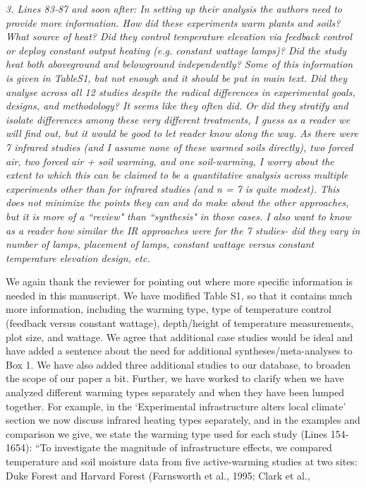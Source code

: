 \documentclass[11pt,a4paper]{letter}
\begin{document}
\begin{letter}{}
\par \emph{3. Lines 83-87 and soon after: In setting up their analysis the authors need to provide more information. How did these experiments warm plants and soils? What source of heat? Did they control temperature elevation via feedback control or deploy constant output heating (e.g. constant wattage lamps)? Did the study heat both aboveground and belowground independently? Some of this information is given in TableS1, but not enough and it should be put in main text. Did they analyse across all 12 studies despite the radical differences in experimental goals, designs, and methodology? It seems like they often did. Or did they stratify and isolate differences among these very different treatments, I guess as a reader we will find out, but it would be good to let reader know along the way. As there were 7 infrared studies (and I assume none of these warmed soils directly), two forced air, two forced air + soil warming, and one soil-warming, I worry about the extent to which this can be claimed to be a quantitative analysis across multiple experiments other than for infrared
studies (and n = 7 is quite modest). This does not minimize the points they can and do make about the other approaches, but it is more of a ``review" than ``synthesis" in those cases. I also want to know as a reader how similar the IR approaches were for the 7 studies- did they vary in number of lamps, placement of lamps, constant wattage versus constant temperature elevation design, etc.}
\par We again thank the reviewer for pointing out where more specific information is needed in this manuscript. We have modified Table S1, so that it contains much more information, including the warming type, type of temperature control (feedback versus constant wattage), depth/height of temperature measurements, plot size, and wattage. We agree that additional case studies would be ideal and have added a sentence about the need for additional syntheses/meta-analyses to Box 1. We have also added three additional studies to our database, to broaden the scope of our paper a bit.  Further, we have worked to clarify when we have analyzed different warming types separately and when they have been lumped together. For example, in the `Experimental infrastructure alters local climate' section we now discuss infrared heating types separately, and in the examples and comparison we give, we state the warming type used for each study (Lines 154-1654): 
``To investigate the magnitude of infrastructure effects, we compared temperature and soil moisture data from five active-warming studies at two sites: Duke Forest and Harvard Forest (Farnsworth et al., 1995; Clark et al.,

\end{letter}
\end{document}
